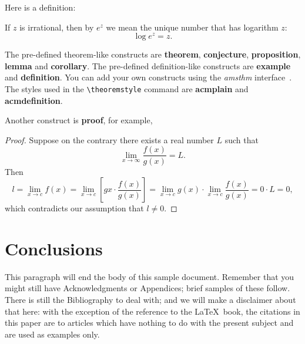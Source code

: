Here is a definition:
\begin{definition}
    If $z$ is irrational, then by $e^z$ we mean the
    unique number that has
    logarithm $z$:
    \begin{displaymath}
        \log e^z = z.
    \end{displaymath}
\end{definition}

The pre-defined theorem-like constructs are \textbf{theorem},
\textbf{conjecture}, \textbf{proposition}, \textbf{lemma} and
\textbf{corollary}. The pre-defined de\-fi\-ni\-ti\-on-like constructs are
\textbf{example} and \textbf{definition}. You can add your own
constructs using the \textsl{amsthm} interface~\cite{Amsthm15}. The
styles used in the \verb|\theoremstyle| command are \textbf{acmplain}
and \textbf{acmdefinition}.

Another construct is \textbf{proof}, for example,

\begin{proof}
    Suppose on the contrary there exists a real number $L$ such that
    \begin{displaymath}
        \lim_{x\rightarrow\infty} \frac{f(x)}{g(x)} = L.
    \end{displaymath}
    Then
    \begin{displaymath}
        l=\lim_{x\rightarrow c} f(x)
        = \lim_{x\rightarrow c}
        \left[ g{x} \cdot \frac{f(x)}{g(x)} \right ]
        = \lim_{x\rightarrow c} g(x) \cdot \lim_{x\rightarrow c}
        \frac{f(x)}{g(x)} = 0\cdot L = 0,
    \end{displaymath}
    which contradicts our assumption that $l\neq 0$.
\end{proof}


\section{Conclusions}
This paragraph will end the body of this sample document.
Remember that you might still have Acknowledgments or
Appendices; brief samples of these
follow. There is still the Bibliography to deal with; and
we will make a disclaimer about that here: with the exception
of the reference to the \LaTeX\ book, the citations in
this paper are to articles which have nothing to
do with the present subject and are used as
examples only.



\appendix


